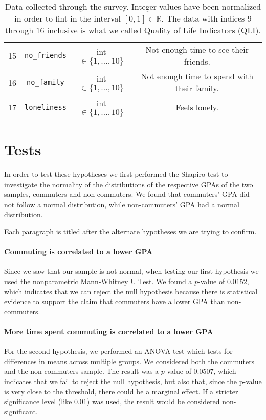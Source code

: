 \documentclass[11pt]{extarticle}
\numberwithin{table}{section}
\numberwithin{figure}{section}
\newcommand{\R}{\mathds{R}}
\numberwithin{equation}{section}
\begin{document}
\begin{table}[!ht]
\begin{tabular}{|c|c|c|c|}
		15         & \texttt{no\_friends}             & int $\in \{1, \dots, 10\}$ & Not enough time to see their friends.               \\
		16         & \texttt{no\_family}              & int $\in \{1, \dots, 10\}$ & Not enough time to spend with their family.         \\
		17         & \texttt{loneliness}              & int $\in \{1, \dots, 10\}$ & Feels lonely.                                       \\
		\hline
	\end{tabular}
	\caption{
		Data collected through the survey.
		Integer values have been normalized in order to fint in the interval $[0,1] \in \R$.
		The data with indices $9$ through $16$ inclusive is what we called Quality of Life Indicators (QLI).
	}
	\label{table:data}
\end{table}

\section{Tests}
\label{sec:tests}

In order to test these hypotheses we first performed the Shapiro test to investigate the normality
of the distributions of the respective GPAs of the two samples, commuters and non-commuters.
We found that commuters' GPA did not follow a normal distribution, while non-commuters' GPA
had a normal distribution.

Each paragraph is titled after the alternate hypotheses we are trying to confirm.

\paragraph{Commuting is correlated to a lower GPA}
Since we saw that our sample is not normal,
when testing our first hypothesis we used the nonparametric Mann-Whitney U Test.
We found a $p$-value of $0.0152$, which indicates that we can reject the null hypothesis because
there is statistical evidence to support the claim that commuters have a lower GPA than non-commuters.

\paragraph{More time spent commuting is correlated to a lower GPA}
For the second hypothesis, we performed an ANOVA test
which tests for differences in means across multiple groups.
We considered both the commuters and the non-commuters sample.
The result was a $p$-value of $0.0507$, which indicates that we fail to reject the null hypothesis,
but also that, since the p-value is very close to the threshold, there could be a marginal effect.
If a stricter significance level (like $0.01$) was used,
the result would be considered non-significant.
\end{document}
